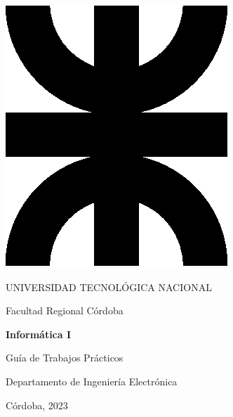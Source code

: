 \thispagestyle{empty}

\begin{center}

\includegraphics[scale=.3]{img/utn.eps}

\medskip
UNIVERSIDAD TECNOLÓGICA NACIONAL

Facultad Regional Córdoba

\vspace{3cm}

\textbf{
  \huge
  Informática I
}

\vspace{2cm}

\LARGE{Guía de Trabajos Prácticos}

\vfill

Departamento de Ingeniería Electrónica

\vspace{1cm}

Córdoba, 2023

\end{center}

